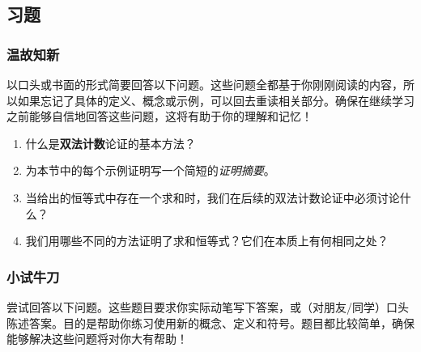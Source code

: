 
\subsection{习题}

\subsubsection*{温故知新}

以口头或书面的形式简要回答以下问题。这些问题全都基于你刚刚阅读的内容，所以如果忘记了具体的定义、概念或示例，可以回去重读相关部分。确保在继续学习之前能够自信地回答这些问题，这将有助于你的理解和记忆！

\begin{enumerate}[label=(\arabic*)]
    \item 什么是\textbf{双法计数}论证的基本方法？
    \item 为本节中的每个示例证明写一个简短的\emph{证明摘要}。
    \item 当给出的恒等式中存在一个求和时，我们在后续的双法计数论证中必须讨论什么？
    \item 我们用哪些不同的方法证明了求和恒等式？它们在本质上有何相同之处？
\end{enumerate}

\subsubsection*{小试牛刀}

尝试回答以下问题。这些题目要求你实际动笔写下答案，或（对朋友/同学）口头陈述答案。目的是帮助你练习使用新的概念、定义和符号。题目都比较简单，确保能够解决这些问题将对你大有帮助！

